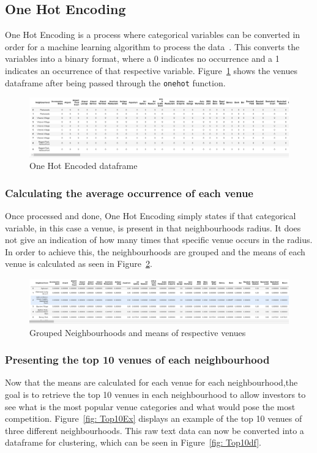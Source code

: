 \documentclass[12pt, conference]{IEEEtran}
\def\code#1{\texttt{#1}}
\begin{document}
\subsection{One Hot Encoding}
One Hot Encoding is a process where categorical variables can be converted in order for a machine learning algorithm to process the data~\cite{OHE}. This converts the variables into a binary format, where a 0 indicates no occurrence and a 1 indicates an occurrence of that respective variable. Figure~\ref{fig: OHE} shows the venues dataframe after being passed through the \code{onehot} function.

\begin{figure}[!h]
\center
\includegraphics[scale=0.45]{OHE}
\caption{One Hot Encoded dataframe}
\label{fig: OHE}
\end{figure}

\subsubsection{Calculating the average occurrence of each venue}
Once processed and done, One Hot Encoding simply states if that categorical variable, in this case a venue, is present in that neighbourhoods radius. It does not give an indication of how many times that specific venue occurs in the radius. In order to achieve this, the neighbourhoods are grouped and the means of each venue is calculated as seen in Figure~\ref{fig: VenuesMean}.

\begin{figure}[!h]
\center
\includegraphics[scale=0.42]{VenuesMean}
\caption{Grouped Neighbourhoods and means of respective venues}
\label{fig: VenuesMean}
\end{figure}

\subsubsection{Presenting the top 10 venues of each neighbourhood}
Now that the means are calculated for each venue for each neighbourhood,the goal is to retrieve the top 10 venues in each neighbourhood to allow investors to see what is the most popular venue categories and what would pose the most competition. Figure~\ref{fig: Top10Ex} displays an example of the top 10 venues of three different neighbourhoods. This raw text data can now be converted into a dataframe for clustering, which can be seen in Figure~\ref{fig: Top10df}.
\end{document}
